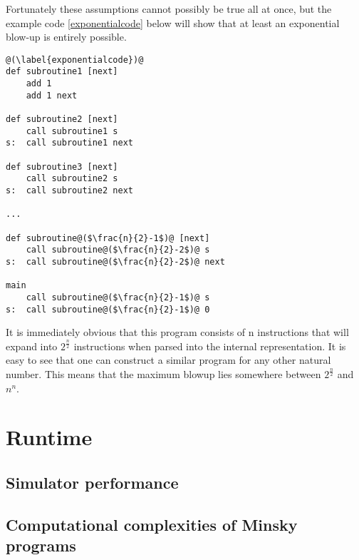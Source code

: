 Fortunately these assumptions cannot possibly be true all at once, but the example code \ref{exponentialcode} below will show that at least an exponential blow-up is entirely possible.
\begin{lstlisting}[frame=single, caption=code resulting in exponential blow-up]
@(\label{exponentialcode})@
def subroutine1 [next]
	add 1
	add 1 next

def subroutine2 [next]
	call subroutine1 s
s:	call subroutine1 next

def subroutine3 [next]
	call subroutine2 s
s:	call subroutine2 next

...

def subroutine@($\frac{n}{2}-1$)@ [next]
	call subroutine@($\frac{n}{2}-2$)@ s
s:	call subroutine@($\frac{n}{2}-2$)@ next

main
	call subroutine@($\frac{n}{2}-1$)@ s
s:	call subroutine@($\frac{n}{2}-1$)@ 0
\end{lstlisting}
It is immediately obvious that this program consists of n instructions that will expand into $2^{\frac{n}{2}}$ instructions when parsed into the internal representation. It is easy to see that one can construct a similar program for any other natural number.
This means that the maximum blowup lies somewhere between $2^{\frac{n}{2}}$ and $n^{n}$.
\section{Runtime}
\subsection{Simulator performance}
\subsection{Computational complexities of Minsky programs}
